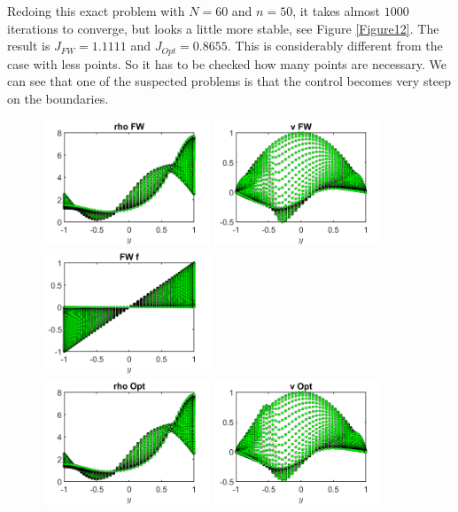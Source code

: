 \documentclass[11pt, a4paper]{article}
\theoremstyle{definition}
\begin{document}
Redoing this exact problem with $N=60$ and $n=50$, it takes almost $1000$ iterations to converge, but looks a little more stable, see Figure \ref{Figure12}.
The result is $J_{FW} = 1.1111$ and $J_{Opt} = 0.8655$. This is considerably different from the case with less points. So it has to be checked how many points are necessary. We can see that one of the suspected problems is that the control becomes very steep on the boundaries.
\begin{figure}
	\includegraphics[width=5cm]{FWrho6.png}
	\includegraphics[width=5cm]{FWv6.png}
	\includegraphics[width=5cm]{FWCont6.png}\\
	\includegraphics[width=5cm]{Optrho6.png}
	\includegraphics[width=5cm]{Optv6.png}

\end{figure}
\end{document}
